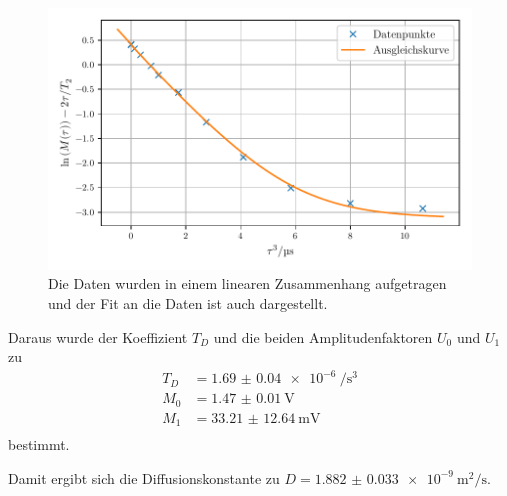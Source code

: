 

\begin{figure}
    \centering
    \includegraphics[width=\textwidth]{plots/echo.pdf}
    \caption{Die Daten wurden in einem linearen Zusammenhang aufgetragen und der Fit an die Daten ist auch dargestellt.}
    \label{abb:echo}
\end{figure}

Daraus wurde der Koeffizient $T_D$ und die beiden Amplitudenfaktoren $U_0$ und $U_1$ zu 
\begin{align*}
T_D &= \SI{1.69(4)e-6}{\per\second\tothe{3}} \\
M_0 &= \SI{1.47(1)}{\volt} \\
M_1 &= \SI{33.21(1264)}{\milli\volt} \\
\end{align*}
bestimmt.

Damit ergibt sich die Diffusionskonstante zu $D = \SI{1.882(33)e-9}{\meter\squared\per\second}$.
